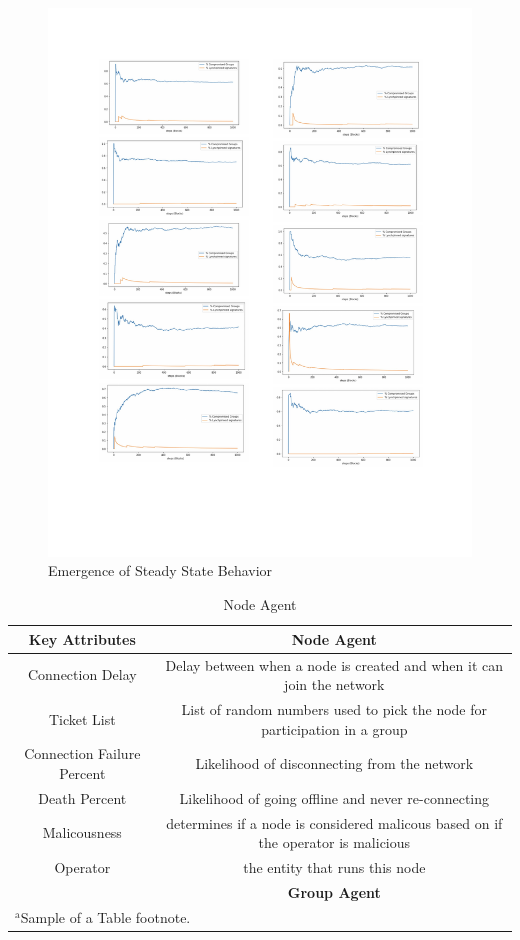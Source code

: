 \documentclass[conference]{IEEEtran}
\begin{document}
\begin{figure}[h]
    \onecolumn
    \centering
    \includegraphics[width=\linewidth]{steady_state_behavior.pdf}
    \caption{Emergence of Steady State Behavior}
    \label{fig:steady_state}
\end{figure}

\newpage
\begin{table}[htbp]
    \caption{Node Agent}
    \begin{center}
    \begin{tabular}{|c|c|}
    \cline{1-2} 
    \textbf{Key Attributes}&{\textbf{Node Agent}} \\
    \cline{1-2} 
    \hline
    Connection Delay & Delay between when a node is created and when it can join the network \\
    Ticket List & List of random numbers used to pick the node for participation in a group\\
    Connection Failure Percent & Likelihood of disconnecting from the network\\
    Death Percent & Likelihood of going offline and never re-connecting\\
    Malicousness & determines if a node is considered malicous based on if the operator is malicious\\
    Operator  & the entity that runs this node\\
    \hline
    \textbf{ }&\textbf{Group Agent} \\
    \multicolumn{2}{l}{$^{\mathrm{a}}$Sample of a Table footnote.}
    \end{tabular}
    \label{table}
    \end{center}
    \end{table}
\end{document}
